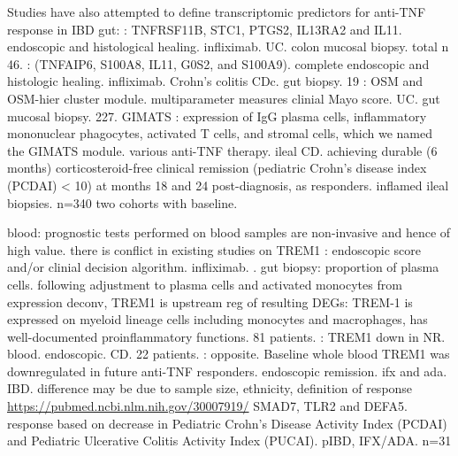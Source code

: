 \begin{outline}
\1 Studies have also attempted to define transcriptomic predictors for anti-TNF response in IBD \autocite{digby-bell2019InterrogatingHostImmunity,noor2020PersonalisedMedicineCrohn}
    \2 gut:
    \2 \autocite{arijs2009MucosalGeneSignatures}: TNFRSF11B, STC1, PTGS2, IL13RA2 and IL11. endoscopic and histological healing. infliximab. UC. colon mucosal biopsy. total n 46.
    \2 \autocite{arijs2010PredictiveValueEpithelial}: (TNFAIP6, S100A8, IL11, G0S2, and S100A9). complete endoscopic and histologic healing. infliximab. Crohn's colitis CDc. gut biopsy. 19
    \2 \autocite{west2017OncostatinDrivesIntestinal}: OSM and OSM-hier cluster module.  multiparameter measures clinial Mayo score.  UC.  gut mucosal biopsy.  227.
    \2 GIMATS \autocite{martin2019SingleCellAnalysisCrohn}:
    expression of IgG plasma cells, inflammatory mononuclear phagocytes, activated T cells, and stromal cells, which we named the GIMATS module.  various anti-TNF therapy.  ileal CD.  achieving durable (6 months) corticosteroid-free clinical remission (pediatric Crohn’s disease index (PCDAI) < 10) at months 18 and 24 post-diagnosis, as responders.  inflamed ileal biopsies.  n=340 two cohorts with baseline.

\1 blood: prognostic tests performed on blood samples are non-invasive and hence of high value.
    \2 there is conflict in existing studies on TREM1
    \2 \autocite{gaujoux2019CellcentredMetaanalysisReveals} : endoscopic score and/or clinial decision algorithm.  infliximab. .
        \3 gut biopsy:   proportion of plasma cells.  following adjustment to plasma cells and activated monocytes from expression deconv, TREM1 is upstream reg of resulting DEGs: TREM-1 is expressed on myeloid lineage cells including monocytes and macrophages, has well-documented proinflammatory functions.  81 patients.
        \3 \autocite{gaujoux2019CellcentredMetaanalysisReveals}: TREM1 down in NR. blood.  endoscopic.  CD.  22 patients.
    \2 \autocite{verstockt2019LowTREM1Expression}: opposite. Baseline whole blood TREM1 was downregulated in future anti-TNF responders. endoscopic remission. ifx and ada. IBD.
    \2 difference may be due to sample size, ethnicity, definition of response \url{https://pubmed.ncbi.nlm.nih.gov/30007919/} \autocite{digby-bell2019InterrogatingHostImmunity}
    \2 \autocite{salvador-martin2020GeneSignaturesEarly} SMAD7, TLR2 and DEFA5. response based on decrease in Pediatric Crohn’s Disease Activity Index (PCDAI) and Pediatric Ulcerative Colitis Activity Index (PUCAI). pIBD, IFX/ADA. n=31


\end{outline}
